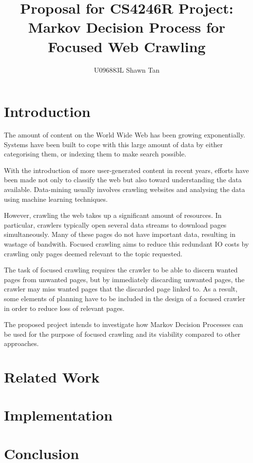 \documentclass{article}
\title{Proposal for CS4246R Project:\\Markov Decision Process for Focused Web Crawling}
\author{U096883L Shawn Tan}
\begin{document}
\maketitle
\section{Introduction}
The amount of content on the World Wide Web has been growing exponentially. Systems have been built to cope with this large amount of data by either categorising them, or indexing them to make search possible.

With the introduction of more user-generated content in recent years, efforts have been made not only to classify the web but also toward understanding the data available. Data-mining usually involves crawling websites and analysing the data using machine learning techniques.

However, crawling the web takes up a significant amount of resources. In particular, crawlers typically open several data streams to download pages simultaneously. Many of these pages do not have important data, resulting in wastage of bandwith. Focused crawling aims to reduce this redundant IO costs by crawling only pages deemed relevant to the topic requested. 

The task of focused crawling requires the crawler to be able to discern wanted pages from unwanted pages, but by immediately discarding unwanted pages, the crawler may miss wanted pages that the discarded page linked to. As a result, some elements of planning have to be included in the design of a focused crawler in order to reduce loss of relevant pages.

The proposed project intends to investigate how Markov Decision Processes can be used for the purpose of focused crawling and its viability compared to other approaches.
\section{Related Work}




\section{Implementation}



\section{Conclusion}
\end{document}
